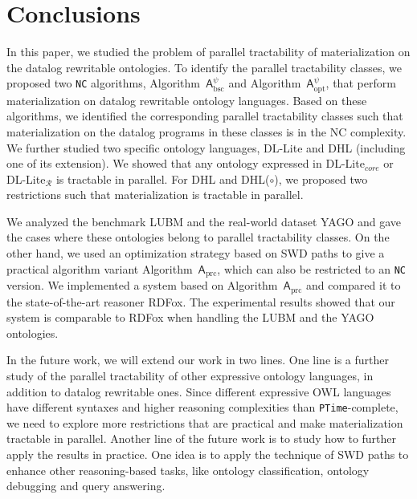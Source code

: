 \section{Conclusions}
\label{sec:conclusion}

In this paper, we studied the problem of parallel tractability of
materialization on the datalog rewritable ontologies.
To identify the parallel tractability classes,
we proposed two \texttt{NC} algorithms, Algorithm~$\mathsf{A}_{\text{bsc}}^\psi$
and Algorithm~$\mathsf{A}_{\text{opt}}^\psi$, that perform materialization on
datalog rewritable ontology languages.
Based on these algorithms, we identified the corresponding
parallel tractability classes such that materialization
on the datalog programs in these classes is in the NC complexity.
We further studied two specific ontology languages, DL-Lite and DHL (including one of its extension).
We showed that any ontology expressed in DL-Lite$_{core}$ or DL-Lite$_{\mathcal{R}}$ is tractable in parallel.
For DHL and DHL($\circ$), we proposed two restrictions such that materialization is tractable in parallel.

We analyzed the benchmark LUBM and the real-world dataset YAGO
and gave the cases where these ontologies belong to parallel tractability classes.
On the other hand, we used an optimization strategy based on SWD paths
to give a practical algorithm variant Algorithm~$\mathsf{A}_{\text{prc}}$, which can
also be restricted to an \texttt{NC} version.
We implemented a system based on Algorithm~$\mathsf{A}_{\text{prc}}$ and compared it to
the state-of-the-art reasoner RDFox.
The experimental results showed that our system is comparable to RDFox when handling
the LUBM and the YAGO ontologies.

In the future work, we will extend our work in two lines.
One line is a further study of the parallel tractability of
other expressive ontology languages, in addition to
datalog rewritable ones. Since different expressive OWL languages
have different syntaxes and higher reasoning complexities than \texttt{PTime}-complete, we need to
explore more restrictions that are practical and make materialization
tractable in parallel. Another line of the future work is to
study how to further apply the
results in practice.
One idea is to apply the technique of SWD paths to enhance other reasoning-based tasks,
like ontology classification, ontology debugging and query answering.




